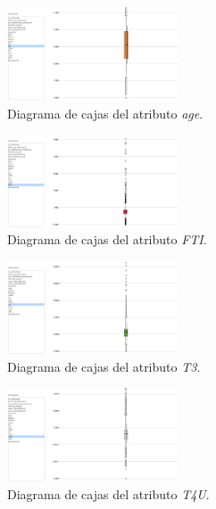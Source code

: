 \documentclass[osajnl,twocolumn,showpacs,superscriptaddress,10pt,floatfix]{revtex4-1} %
\begin{document}
\begin{figure}[H]
    \centering
    \includegraphics[width=0.45\textwidth]{analysis/box_plot_age}
    \caption{Diagrama de cajas del atributo \textit{age}.}
    \label{figure:box_plot_age}
\end{figure}

\begin{figure}[H]
    \centering
    \includegraphics[width=0.45\textwidth]{analysis/box_plot_FTI}
    \caption{Diagrama de cajas del atributo \textit{FTI}.}
    \label{figure:box_plot_FTI}
\end{figure}

\begin{figure}[H]
    \centering
    \includegraphics[width=0.45\textwidth]{analysis/box_plot_T3}
    \caption{Diagrama de cajas del atributo \textit{T3}.}
    \label{figure:box_plot_T3}
\end{figure}

\begin{figure}[H]
    \centering
    \includegraphics[width=0.45\textwidth]{analysis/box_plot_T4U}
    \caption{Diagrama de cajas del atributo \textit{T4U}.}
    \label{figure:box_plot_T4U}
\end{figure}
\end{document}
